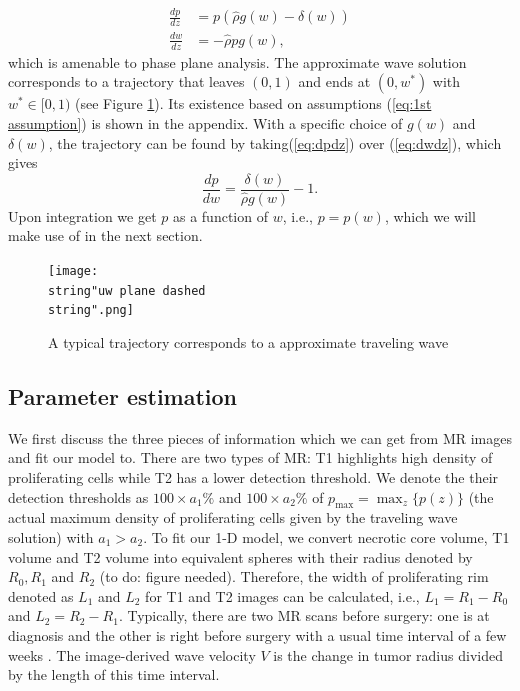 \documentclass{aims}
\numberwithin{equation}{section}
\begin{document}
\begin{subequations}\label{eq:pp system}
\begin{align}
\frac{dp}{dz} & =p(\hat{\rho}g(w)-\delta(w))\label{eq:dpdz}\\
\frac{dw}{dz} & =-\hat{\rho}pg(w),\label{eq:dwdz}
\end{align}
\end{subequations}which is amenable to phase plane analysis. The
approximate wave solution corresponds to a trajectory that leaves
$(0,1)$ and ends at $(0,w^{*})$ with $w^{*}\in[0,1)$ (see Figure
\ref{fig:pp}). Its existence based on assumptions (\ref{eq:1st assumption})
is shown in the appendix. With a specific choice of $g(w)$ and $\delta(w)$,
the trajectory can be found by taking(\ref{eq:dpdz}) over (\ref{eq:dwdz}),
which gives 
\[
\frac{dp}{dw}=\frac{\delta(w)}{\hat{\rho}g(w)}-1.
\]
 Upon integration we get $p$ as a function of $w$, i.e., $p=p(w)$,
which we will make use of in the next section. 

\begin{figure}
\begin{center}
\texttt{[image: \\string"uw plane dashed\\string".png]}\caption{\label{fig:pp}A typical trajectory corresponds to a approximate traveling
wave}
\end{center}
\end{figure}

\subsection{Parameter estimation}

We first discuss the three pieces of information which we can get
from MR images and fit our model to. There are two types of MR: T1
highlights high density of proliferating cells while T2 has a lower
detection threshold. We denote the their detection thresholds as $100\times a_{1}\%$
and $100\times a_{2}\%$ of $p_{\max}=\max_{z}\{p(z)\}$ (the actual
maximum density of proliferating cells given by the traveling wave
solution) with $a_{1}>a_{2}$. To fit our 1-D model, we convert necrotic
core volume, T1 volume and T2 volume into equivalent spheres with
their radius denoted by $R_{0},R_{1}$ and $R_{2}$ (to do: figure
needed). Therefore, the width of proliferating rim denoted as $L_{1}$
and $L_{2}$ for T1 and T2 images can be calculated, i.e., $L_{1}=R_{1}-R_{0}$
and $L_{2}=R_{2}-R_{1}$. Typically, there are two MR scans before
surgery: one is at diagnosis and the other is right before surgery
with a usual time interval of a few weeks \cite{Swanson2008}. The
image-derived wave velocity $V$ is the change in tumor radius divided
by the length of this time interval. 
\end{document}
